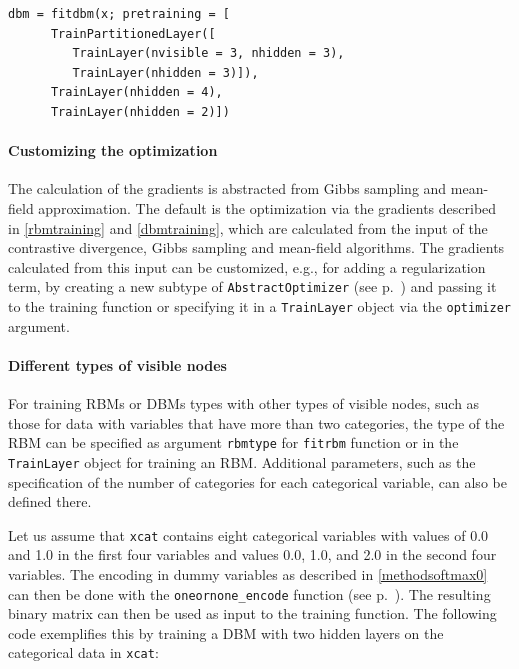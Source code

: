 \documentclass[12pt]{article}
\newcommand{\inlinecode}[1]{\texttt{#1}}
\begin{document}
\begin{lstlisting}[caption={Fitting a partitioned DBM},label={lst:partdbm}]
dbm = fitdbm(x; pretraining = [
      TrainPartitionedLayer([
         TrainLayer(nvisible = 3, nhidden = 3), 
         TrainLayer(nhidden = 3)]),
      TrainLayer(nhidden = 4),
      TrainLayer(nhidden = 2)])
\end{lstlisting}

\paragraph{Customizing the optimization}

The calculation of the gradients is abstracted from Gibbs sampling and mean-field approximation.
The default is the optimization via the gradients described in \ref{rbmtraining} and \ref{dbmtraining}, which are calculated from the input of the contrastive divergence, Gibbs sampling and mean-field algorithms.
The gradients calculated from this input can be customized, e.g., for adding a regularization term, by creating a new subtype of \inlinecode{AbstractOptimizer} (see p.\ \pageref{bms_AbstractOptimizer}) and passing it to the training function or specifying it in a \inlinecode{TrainLayer} object via the \inlinecode{optimizer} argument.


\paragraph{Different types of visible nodes}

For training RBMs or DBMs types with other types of visible nodes, such as those for data with variables that have more than two categories, the type of the RBM can be specified as argument \inlinecode{rbmtype} for \inlinecode{fitrbm} function or in the \inlinecode{TrainLayer} object for training an RBM.
Additional parameters, such as the specification of the number of categories for each categorical variable, can also be defined there.

Let us assume that \inlinecode{xcat} contains eight categorical variables with values of 0.0 and 1.0 in the first four variables and values 0.0, 1.0, and 2.0 in the second four variables.
The encoding in dummy variables as described in \ref{methodsoftmax0} can then be done with the \inlinecode{oneornone\_encode} function (see p.\ \pageref{bms_oneornone_encode}).
The resulting binary matrix can then be used as input to the training function.
The following code exemplifies this by training a DBM with two hidden layers on the categorical data in \inlinecode{xcat}:
\end{document}

